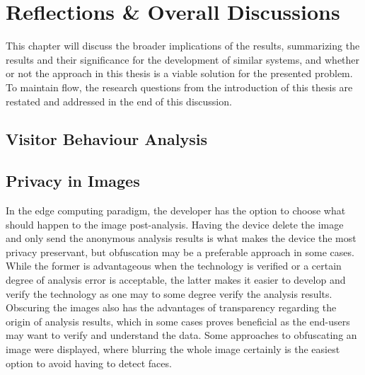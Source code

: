 \section{Reflections \& Overall Discussions}
This chapter will discuss the broader implications of the results, summarizing the results and their significance for the development of similar systems, and whether or not the approach in this thesis is a viable solution for the presented problem. To maintain flow, the research questions from the introduction of this thesis are restated and addressed in the end of this discussion.


\subsection{Visitor Behaviour Analysis}


\subsection{Privacy in Images}
In the edge computing paradigm, the developer has the option to choose what should happen to the image post-analysis. Having the device delete the image and only send the anonymous analysis results is what makes the device the most privacy preservant, but obfuscation may be a preferable approach in some cases. While the former is advantageous when the technology is verified or a certain degree of analysis error is acceptable, the latter makes it easier to develop and verify the technology as one may to some degree verify the analysis results.  Obscuring the images also has the advantages of transparency regarding the origin of analysis results, which in some cases proves beneficial as the end-users may want to verify and understand the data. Some approaches to obfuscating an image were displayed, where blurring the whole image certainly is the easiest option to avoid having to detect faces. 

